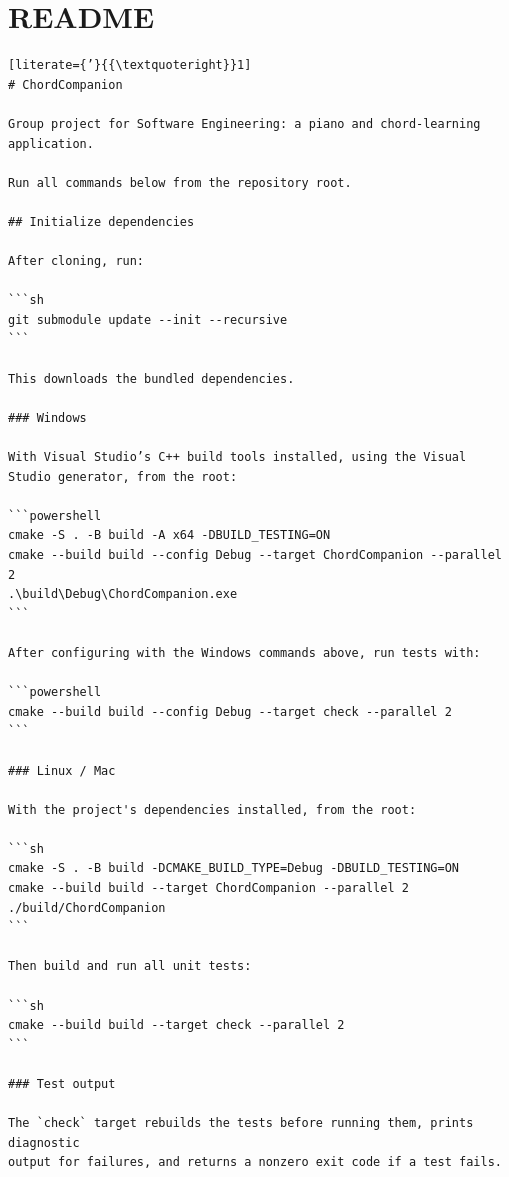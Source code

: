 \documentclass[10pt,letterpaper]{article}
\begin{document}
\section{README}
\begin{lstlisting}[literate={’}{{\textquoteright}}1]
# ChordCompanion

Group project for Software Engineering: a piano and chord-learning application.

Run all commands below from the repository root.

## Initialize dependencies

After cloning, run:

```sh
git submodule update --init --recursive
```

This downloads the bundled dependencies.

### Windows

With Visual Studio’s C++ build tools installed, using the Visual Studio generator, from the root: 

```powershell
cmake -S . -B build -A x64 -DBUILD_TESTING=ON
cmake --build build --config Debug --target ChordCompanion --parallel 2
.\build\Debug\ChordCompanion.exe
```

After configuring with the Windows commands above, run tests with:

```powershell
cmake --build build --config Debug --target check --parallel 2
```

### Linux / Mac

With the project's dependencies installed, from the root:

```sh
cmake -S . -B build -DCMAKE_BUILD_TYPE=Debug -DBUILD_TESTING=ON
cmake --build build --target ChordCompanion --parallel 2
./build/ChordCompanion
```

Then build and run all unit tests:

```sh
cmake --build build --target check --parallel 2
```

### Test output

The `check` target rebuilds the tests before running them, prints diagnostic
output for failures, and returns a nonzero exit code if a test fails.
\end{lstlisting}
\end{document}
